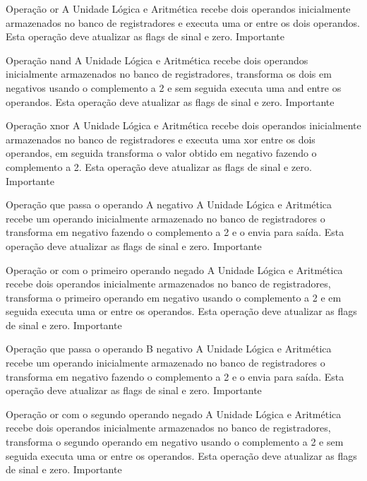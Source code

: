 \documentclass{report}
\begin{document}
\begin{functional}
      \requirement
      {Operação or}
      {A Unidade Lógica e Aritmética recebe dois operandos inicialmente armazenados no banco de registradores e executa uma or entre os dois operandos. Esta operação deve atualizar as flags de sinal e zero.}
      {Importante}
      
      \requirement
      {Operação nand}
      {A Unidade Lógica e Aritmética recebe dois operandos inicialmente armazenados no banco de registradores, transforma os dois em negativos usando o complemento a 2 e sem seguida executa uma and entre os  operandos. Esta operação deve atualizar as flags de sinal e zero.}
      {Importante}
      
       \requirement
      {Operação xnor}
      {A Unidade Lógica e Aritmética recebe dois operandos inicialmente armazenados no banco de registradores e executa uma xor entre os dois operandos, em seguida transforma o valor obtido em negativo fazendo o complemento a 2. Esta operação deve atualizar as flags de sinal e zero.}
      {Importante}
      
      \requirement
      {Operação que passa o operando A negativo}
      {A Unidade Lógica e Aritmética recebe um operando inicialmente armazenado no banco de registradores o transforma em negativo fazendo o complemento a 2 e o envia para saída. Esta operação deve atualizar as flags de sinal e zero.}
      {Importante}
      
       \requirement
      {Operação or com o primeiro operando negado}
      {A Unidade Lógica e Aritmética recebe dois operandos inicialmente armazenados no banco de registradores, transforma o primeiro operando em negativo usando o complemento a 2 e em seguida executa uma or entre os  operandos. Esta operação deve atualizar as flags de sinal e zero.}
      {Importante}
      
       \requirement
      {Operação que passa o operando B negativo}
      {A Unidade Lógica e Aritmética recebe um operando inicialmente armazenado no banco de registradores o transforma em negativo fazendo o complemento a 2 e o envia para saída. Esta operação deve atualizar as flags de sinal e zero.}
      {Importante}
      
       \requirement
      {Operação or com o segundo operando negado}
      {A Unidade Lógica e Aritmética recebe dois operandos inicialmente armazenados no banco de registradores, transforma o segundo operando em negativo usando o complemento a 2 e sem seguida executa uma or entre os operandos. Esta operação deve atualizar as flags de sinal e zero.}
      {Importante}
      

\end{functional}
\end{document}
